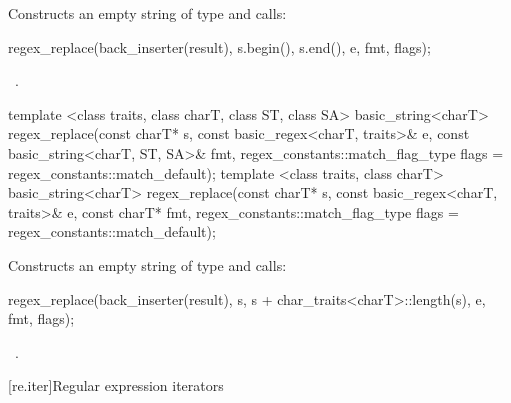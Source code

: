 \begin{itemdescr}
\pnum\effects  Constructs an empty string  of
type  and calls: 
\begin{codeblock}
regex_replace(back_inserter(result), s.begin(), s.end(), e, fmt, flags);
\end{codeblock}

\pnum
\returns\ .
\end{itemdescr}

%
\begin{itemdecl}
template <class traits, class charT, class ST, class SA>
  basic_string<charT>
  regex_replace(const charT* s,
                const basic_regex<charT, traits>& e,
                const basic_string<charT, ST, SA>& fmt,
                regex_constants::match_flag_type flags =
                  regex_constants::match_default);
template <class traits, class charT>
  basic_string<charT>
  regex_replace(const charT* s,
                const basic_regex<charT, traits>& e,
                const charT* fmt,
                regex_constants::match_flag_type flags =
                  regex_constants::match_default);
\end{itemdecl}

\begin{itemdescr}
\pnum
\effects  Constructs an empty string  of
type  and calls: 
\begin{codeblock}
regex_replace(back_inserter(result),
              s, s + char_traits<charT>::length(s), e, fmt, flags);
\end{codeblock}

\pnum
\returns\ .
\end{itemdescr}

[re.iter]{Regular expression iterators}

